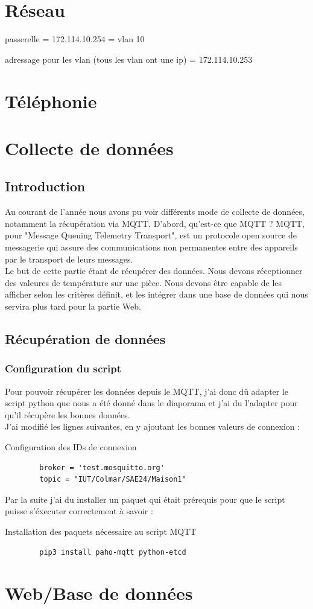 \documentclass[12pt, a4paper]{article}
\begin{document}
\newpage
\section{Réseau}

passerelle = 172.114.10.254 = vlan 10

adressage pour les vlan (tous les vlan ont une ip) = 172.114.10.253



\newpage
\section{Téléphonie}


\newpage
\section{Collecte de données}
\subsection{Introduction}
Au courant de l'année nous avons pu voir différents mode de collecte de
données, notamment la récupération via MQTT. D'abord, qu'est-ce que MQTT ?
MQTT, pour "Message Queuing Telemetry Transport", est un protocole
open source de messagerie qui assure des communications non permanentes
entre des appareils par le transport de leurs messages.\\
Le but de cette partie étant de récupérer des données. Nous devons réceptionner
des valeures de température sur une pièce. Nous devons être capable de
les afficher selon les critères définit, et les intégrer dans une base de
données qui nous servira plus tard pour la partie Web. 
	\subsection{Récupération de données}
		\subsubsection{Configuration du script}
		Pour pouvoir récupérer les données depuis le MQTT, j'ai donc dû
		adapter le script python que nous a été donné dans le diaporama
		et j'ai du l'adapter pour qu'il récupère les bonnes données.\\ 
		J'ai modifié les lignes suivantes, en y ajoutant les bonnes valeurs
		de connexion :
		\begin{listing}[H]
			\caption{Configuration des IDs de connexion}
			\label{lst:id}
			\begin{verbatim}
		broker = 'test.mosquitto.org'
		topic = "IUT/Colmar/SAE24/Maison1"
			\end{verbatim}
		\end{listing}
		Par la suite j'ai du installer un paquet qui était prérequis 
		pour que le script puisse s'éxecuter correctement à savoir :
		\begin{listing}[H]
			\caption{Installation des paquets nécessaire au script MQTT}
			\label{lst:paho}
			\begin{verbatim}
		pip3 install paho-mqtt python-etcd
			\end{verbatim}
		\end{listing}


\newpage
\section{Web/Base de données}
\end{document}
